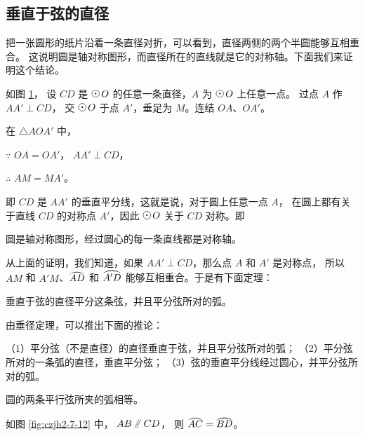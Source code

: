 \subsection{垂直于弦的直径}\label{subsec:czjh2-7-3}

把一张圆形的纸片沿着一条直径对折，可以看到，直径两侧的两个半圆能够互相重合。
这说明圆是轴对称图形，而直径所在的直线就是它的对称轴。下面我们来证明这个结论。

\begin{figure}
    \centering
    
    \caption{}\label{fig:czjh2-7-11}
\end{figure}

如图 \ref{fig:czjh2-7-11}， 设 $CD$ 是 $\yuan\,O$ 的任意一条直径，$A$ 为 $\yuan\,O$ 上任意一点。
过点 $A$ 作 $AA' \perp CD$， 交 $\yuan\,O$ 于点 $A'$，垂足为 $M$。连结 $OA$、$OA'$。

在 $\triangle AOA'$ 中，

$\because$ \quad $OA = OA'$， $AA' \perp CD$，

$\therefore$ \quad $AM = MA'$。

即 $CD$ 是 $AA'$ 的垂直平分线，这就是说，对于圆上任意一点 $A$，
在圆上都有关于直线 $CD$ 的对称点 $A'$，因此 $\yuan\,O$ 关于 $CD$ 对称。即

\begin{xingzhi}
    圆是轴对称图形，经过圆心的每一条直线都是对称轴。
\end{xingzhi}

从上面的证明，我们知道，如果 $AA' \perp CD$，那么点 $A$ 和 $A'$ 是对称点，
所以 $AM$ 和 $A'M$、$\yuanhu{AD}$ 和 $\yuanhu{A'D}$ 能够互相重合。于是有下面定理：

\begin{dingli}[垂径定理]
    垂直于弦的直径平分这条弦，并且平分弦所对的弧。
\end{dingli}

由垂径定理，可以推出下面的推论：

\begin{tuilun}[推论1]
    （1）平分弦（不是直径）的直径垂直于弦，并且平分弦所对的弧；
    （2）平分弦所对的一条弧的直径，垂直平分弦；
    （3）弦的垂直平分线经过圆心，并平分弦所对的弧。
\end{tuilun}

\begin{tuilun}[推论2]
    圆的两条平行弦所夹的弧相等。
\end{tuilun}

如图 \ref{fig:czjh2-7-12} 中， $AB \pingxing CD$， 则 $\yuanhu{AC} = \yuanhu{BD}$。

